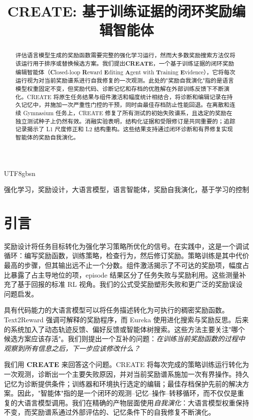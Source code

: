 \documentclass[conference]{IEEEtran}
\title{CREATE: 基于训练证据的闭环奖励编辑智能体}
\author{\IEEEauthorblockN{匿名作者}\IEEEauthorblockA{匿名投稿}}
\begin{document}
\begin{CJK}{UTF8}{gbsn}
\maketitle

\begin{abstract}
评估语言模型生成的奖励函数需要完整的强化学习运行，然而大多数奖励搜索方法仅将该运行用于排序或替换候选方案。我们提出\textbf{CREATE}，一个基于训练证据的闭环奖励编辑智能体（\textbf{C}losed-loop \textbf{R}eward \textbf{E}diting \textbf{A}gent with \textbf{T}raining \textbf{E}vidence），它将每次运行视为对当前奖励谱系进行自我修复的一次观测。此处的"奖励自我演化"指的是语言模型权重固定不变，但奖励代码、诊断记忆和存档的优胜解在外部训练反馈下不断演化。CREATE 将原生任务结果与组件激活和幅度统计相结合，将诊断和编辑记录在持久记忆中，并施加一次严重性门控的干预，同时由最佳存档防止性能回退。在离散和连续 Gymnasium 任务上，CREATE 修复了所有测试的初始失败谱系，且选定的奖励在独立测试种子上仍然有效。消融实验表明，结构化证据和受限修订是共同重要的；追踪记录揭示了 L1 尺度修正和 L2 结构重构。这些结果支持通过闭环诊断和有界修复实现智能体的奖励自我演化。
\end{abstract}

\begin{IEEEkeywords}
强化学习，奖励设计，大语言模型，语言智能体，奖励自我演化，基于学习的控制
\end{IEEEkeywords}

\section{引言}
奖励设计将任务目标转化为强化学习策略所优化的信号。在实践中，这是一个调试循环：编写奖励函数，训练策略，检查行为，然后修订奖励。策略训练是其中代价最高的步骤，但其输出远不止一个分数。组件激活揭示了不可达的奖励项，幅度占比暴露了占主导地位的项，episode 结果区分了任务失败与奖励利用。这些测量补充了基于回报的标准 RL 视角。我们的公式受奖励塑形失败和更广泛的奖励误设问题启发。

具有代码能力的大语言模型可以将任务描述转化为可执行的稠密奖励函数。Text2Reward 强调可解释的奖励程序，而 Eureka 使用进化搜索与奖励反思。后来的系统加入了动态轨迹反馈、偏好反馈或智能体树搜索。这些方法主要关注"哪个候选方案应该存活"。我们则提出一个互补的问题：\emph{在训练当前奖励函数的过程中观察到所有信息之后，下一步应该修改什么？}

我们用 \textbf{CREATE} 来回答这个问题。CREATE 将每次完成的策略训练运行转化为一次观测，诊断出一个主要失败原因，并对当前奖励谱系施加一次有界操作。持久记忆为诊断提供条件；训练器和环境执行选定的编辑；最佳存档保护先前的解决方案。因此，"智能体"指的是一个闭环的观测--记忆--操作--转移循环，而不仅仅是重复的大语言模型调用。我们在精确的产物层面使用\emph{自我演化}：大语言模型权重保持不变，而奖励谱系通过外部评估的、记忆条件下的自我修复不断演化。


\end{CJK}
\end{document}
